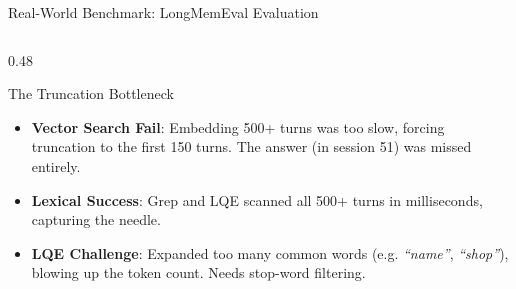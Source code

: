 \documentclass[aspectratio=169]{beamer}
\begin{document}
\begin{frame}{Real-World Benchmark: LongMemEval Evaluation}
    \begin{columns}[T]
        \begin{column}{0.48\textwidth}
            \begin{block}{The Truncation Bottleneck}
                \small
                \begin{itemize}
                    \item \textbf{Vector Search Fail}: Embedding 500+ turns was too slow, forcing truncation to the first 150 turns. The answer (in session 51) was missed entirely.
                    \item \textbf{Lexical Success}: Grep and LQE scanned all 500+ turns in milliseconds, capturing the needle.
                    \item \textbf{LQE Challenge}: Expanded too many common words (e.g. \textit{``name''}, \textit{``shop''}), blowing up the token count. Needs stop-word filtering.
                \end{itemize}
            \end{block}
        \end{column}
    \end{columns}
\end{frame}
\end{document}
